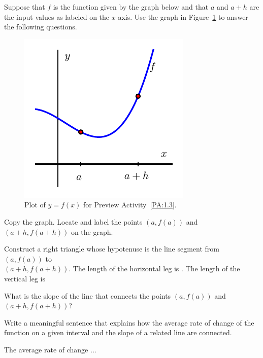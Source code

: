 \documentclass{ximera}
\begin{document}
\begin{question}
Suppose that $f$ is the function given by the graph below and that $a$ and $a+h$ are the input values as labeled on the $x$-axis.  Use the graph in Figure~\ref{F:1.3.PA1} to answer the following questions.

\begin{figure}[h]
\begin{center}
\includegraphics{figures/1_3_PA1.pdf}
\caption{Plot of $y = f(x)$ for Preview Activity~\ref{PA:1.3}.} \label{F:1.3.PA1}
\end{center}
\end{figure}
Copy the graph. Locate and label the points $(a,f(a))$ and $(a+h, f(a+h))$ on the graph.

Construct a right triangle whose hypotenuse is the line segment from $(a,f(a))$ to \\ $(a+h,f(a+h))$. The length of the horizontal leg is .
The length of the vertical leg is 
\begin{multipleChoice}
\end{multipleChoice}

What is the slope of the line that connects the points $(a,f(a))$ and $(a+h, f(a+h))$?
\begin{multipleChoice}
\end{multipleChoice}

Write a meaningful sentence that explains how the average rate of change of the function on a given interval and the slope of a related line are connected.
\begin{freeResponse}
The average rate of change ...
\end{freeResponse}

\end{question}
\end{document}
